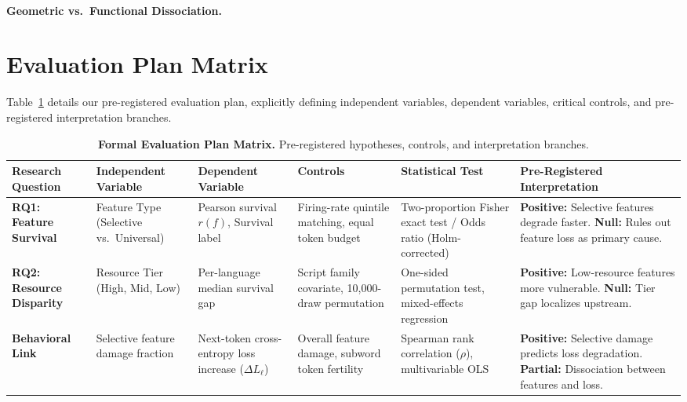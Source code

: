 \documentclass[11pt]{article}
\begin{document}
\paragraph{Geometric vs.\ Functional Dissociation.}

\section{Evaluation Plan Matrix}
Table~\ref{tab:eval_plan} details our pre-registered evaluation plan, explicitly defining independent variables, dependent variables, critical controls, and pre-registered interpretation branches.

\begin{table}[t]
\centering
\small
\begin{tabularx}{\textwidth}{lXXXXX}
\toprule
\textbf{Research Question} & \textbf{Independent Variable} & \textbf{Dependent Variable} & \textbf{Controls} & \textbf{Statistical Test} & \textbf{Pre-Registered Interpretation} \\
\midrule
\textbf{RQ1: Feature Survival} & Feature Type (Selective vs.\ Universal) & Pearson survival $r(f)$, Survival label & Firing-rate quintile matching, equal token budget & Two-proportion Fisher exact test / Odds ratio (Holm-corrected) & \textbf{Positive:} Selective features degrade faster. \newline \textbf{Null:} Rules out feature loss as primary cause. \\
\midrule
\textbf{RQ2: Resource Disparity} & Resource Tier (High, Mid, Low) & Per-language median survival gap & Script family covariate, 10,000-draw permutation & One-sided permutation test, mixed-effects regression & \textbf{Positive:} Low-resource features more vulnerable. \newline \textbf{Null:} Tier gap localizes upstream. \\
\midrule
\textbf{Behavioral Link} & Selective feature damage fraction & Next-token cross-entropy loss increase ($\Delta L_\ell$) & Overall feature damage, subword token fertility & Spearman rank correlation ($\rho$), multivariable OLS & \textbf{Positive:} Selective damage predicts loss degradation. \newline \textbf{Partial:} Dissociation between features and loss. \\
\bottomrule
\end{tabularx}
\caption{\textbf{Formal Evaluation Plan Matrix.} Pre-registered hypotheses, controls, and interpretation branches.}
\label{tab:eval_plan}
\end{table}
\end{document}
